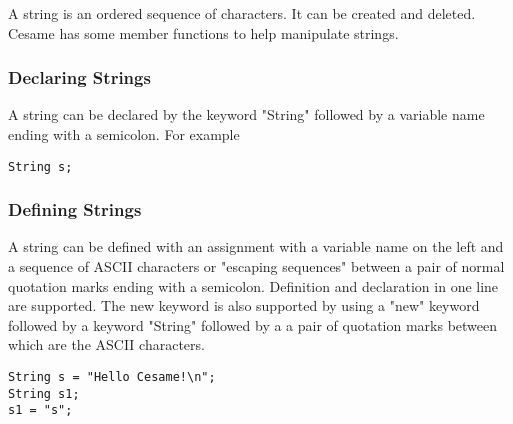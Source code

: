A string is an ordered sequence of characters. It can be created and deleted. Cesame has some member functions to help manipulate strings.
\subsubsection{Declaring Strings}
A string can be declared by the keyword "String" followed by a variable name ending with a semicolon. For example
\begin{lstlisting}[caption={string\_declaration.csm}, captionpos=b]
String s;
\end{lstlisting}
\subsubsection{Defining Strings}
A string can be defined with an assignment with a variable name on the left and a sequence of ASCII characters or "escaping sequences" between a pair of normal quotation marks ending with a semicolon. Definition and declaration in one line are supported. The new keyword is also supported by using a "new" keyword followed by a keyword "String" followed by a a pair of quotation marks between which are the ASCII characters.
\begin{lstlisting}[caption={string\_definition.csm}, captionpos=b]
String s = "Hello Cesame!\n";
String s1;
s1 = "s";
\end{lstlisting}
